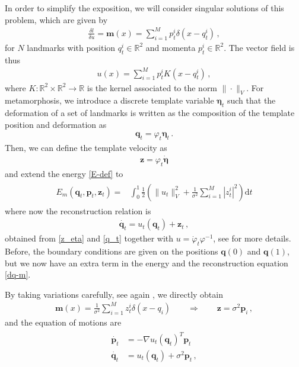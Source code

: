 \documentclass[runningheads]{llncs}
\newcommand{\half}{\frac 12}
\newcommand{\norm}[2]{\| #1 \|_{ #2 }}
\newcommand{\vnorm}[1]{\norm{ #1 }{V}}
\newcommand{\diff}[1]{\text{d} #1}
\begin{document}
In order to simplify the exposition, we will consider singular solutions of this
problem, which are given by
\begin{align}
  \frac{\delta l}{\delta u} = \mathbf m(x) = \sum_{i=1}^M p_t^i \delta(x-q_t^i)\,, 
\end{align}
for $N$ landmarks with position $q_t^i\in \mathbb R^2 $ and momenta $p_t^i \in
\mathbb R^2$. The vector field is thus 
\begin{align}
  u(x) = \sum_{i=1}^M p_t^i K(x-q_t^i)\,, 
  \label{u-def}
\end{align}
where $K:\mathbb R^2\times \mathbb R^2\to \mathbb R$ is the kernel associated to
the norm $\|\cdot \|_V$.  For metamorphosis, we introduce a discrete template
variable $\boldsymbol \eta_t$ such that the deformation of a set of landmarks is
written as the composition of the template position and deformation as
\begin{align}
  \mathbf q_t = \varphi_t \boldsymbol \eta_t\, . 
  \label{q_t}
\end{align}
Then, we can define the template velocity as 
\begin{align}
  \mathbf z = \varphi_t \dot {\boldsymbol \eta}
  \label{z_eta}
\end{align}
and extend the energy \eqref{E-def} to 
\begin{align}
  \begin{split}
    E_m(\mathbf q_t, \mathbf p_t, \mathbf z_t) = & \int_0^1
    \half  \left (\vnorm{u_t}^2 + \frac{1}{\sigma^2} \sum_{i=1}^M |z_t^i|^2\right )\diff{t}
  \end{split}
  \label{E_m-def}
\end{align}
where now the reconstruction relation is 
\begin{align}
    \dot{\mathbf q_t} = u_t (\mathbf q_t) + \mathbf z_t\, , 
    \label{dq-m}
\end{align}
obtained from \eqref{z_eta} and \eqref{q_t} together with  $u= \dot \varphi_t \varphi^{-1}$, 
see \cite{holm2009euler} for more details.  
Before, the boundary conditions are given on the positions $\mathbf q(0)$ and $\mathbf
q(1)$, but we now have an extra term in the energy and the reconstruction
equation \eqref{dq-m}. 

By taking variations carefully, see again \cite{holm2009euler}, we directly obtain 
\begin{align}
  \mathbf m(x) = \frac{1}{\sigma^2} \sum_{i=1}^M z_t^i\delta(x-q_i)\qquad \Rightarrow \qquad
  \mathbf z = \sigma^2 \mathbf p_i\, , 
\end{align}
and the equation of motions are
\begin{align}
  \begin{split}
  \dot{\mathbf p_t} &= - \nabla u_t(\mathbf q_t)^T \mathbf p_t\\ 
  \dot{\mathbf q_t} &= u_t(\mathbf q_t) +  \sigma^2\mathbf p_t \,,
  \end{split}
  \label{eq-m-classic}
\end{align}
\end{document}
